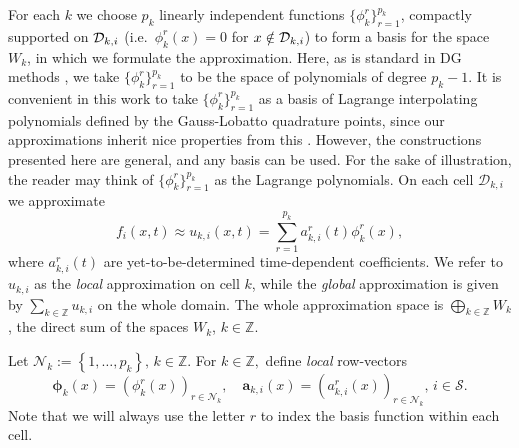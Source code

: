 For each \(k\) we choose \(p_k\) linearly independent functions \(\{\phi^r_k\}_{r=1}^{p_k}\), compactly supported on \(\mathcal{D}_{k,i}\) (i.e.~\(\phi^r_k(x)=0\) for \(x\notin\mathcal{D}_{k,i}\)) to form a basis for the space \(W_k\), in which we formulate the approximation. Here, as is standard in DG methods \citep{nodalDGBook}, we take \(\{\phi^r_k\}_{r=1}^{p_k}\) to be the space of polynomials of degree \(p_k-1\). It is convenient in this work to take \(\{\phi^r_k\}_{r=1}^{p_k}\) as a basis of Lagrange interpolating polynomials defined by the Gauss-Lobatto quadrature points, since our approximations inherit nice properties from this \citep{nodalDGBook}. However, the constructions presented here are general, and any basis can be used. For the sake of illustration, the reader may think of \(\{\phi^r_k\}_{r=1}^{p_k}\) as the Lagrange polynomials. On each cell \(\mathcal D_{k,i}\) we approximate 
\[f_i(x,t)\approx u_{k,i}(x,t)=\sum\limits_{r=1}^{p_k}a_{k,i}^r(t)\phi^r_k(x),\] 
where \(a_{k,i}^r(t)\) are yet-to-be-determined time-dependent coefficients. We refer to \(u_{k,i}\) as the \textit{local} approximation on cell \(k\), while the \textit{global} approximation is given by \(\sum\limits_{k\in\mathbb Z}u_{k,i}\) on the whole domain. The whole approximation space is \(\bigoplus\limits_{k\in\mathbb Z} W_k\), the direct sum of the spaces \(W_k\), \(k\in\mathbb Z\).

Let \(\mathcal N_k := \left\{1,\dots,p_k\right\},\, k \in \mathbb Z\). For \(k\in\mathbb Z,\) define \textit{local} row-vectors 
\[\boldsymbol \phi_k(x) = (\phi^r_k(x))_{r\in\mathcal N_k}, \quad \boldsymbol a_{k,i}(x) = (a_{k,i}^r(x))_{r\in\mathcal N_k},\,i\in\mathcal S.\]
Note that we will always use the letter \(r\) to index the basis function within each cell.

